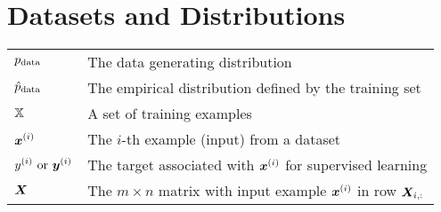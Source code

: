 %
\section*{Datasets and Distributions}
\def\arraystretch{1.5}
\begin{longtable}{p{}p{}}
$\displaystyle p_{\rm{data}}$ & The data generating distribution\\
$\displaystyle \hat{p}_{\rm{data}}$ & The empirical distribution defined by the training set\\
$\displaystyle {\mathbb{X}}$ & A set of training examples\\
$\displaystyle {\bm{x}}^{(i)}$ & The $i$-th example (input) from a dataset\\
$\displaystyle y^{(i)}\text{ or }{\bm{y}}^{(i)}$ & The target associated with ${\bm{x}}^{(i)}$ for supervised learning\\
$\displaystyle {\bm{X}}$ & The $m \times n$ matrix with input example ${\bm{x}}^{(i)}$ in row ${\bm{X}}_{i,:}$\\
\end{longtable}